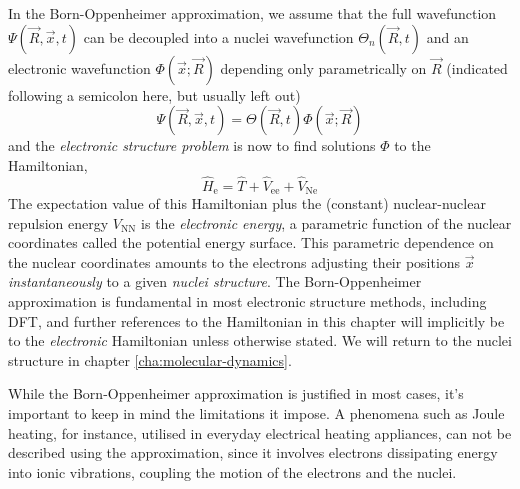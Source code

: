 \documentclass[11pt,bibliography=totoc,index=totoc]{scrbook}   %
\begin{document}


In the Born-Oppenheimer approximation, we assume that the full wavefunction $\Psi(\vec{R},\vec{x},t)$ can be decoupled into 
a nuclei wavefunction $\Theta_n(\vec{R},t)$ and an electronic wavefunction $\Phi(\vec{x};\vec{R})$ depending only parametrically on $\vec{R}$
(indicated following a semicolon here, but usually left out)
\begin{equation}
  \Psi(\vec{R},\vec{x},t) = \Theta(\vec{R},t)\Phi(\vec{x};\vec{R})
\end{equation}
and the \emph{electronic structure problem} is now to find solutions $\Phi$ to the Hamiltonian,
\begin{equation}
    \hat{H}_{\text{e}} = \hat{T} + \hat{V}_{\text{ee}} + \hat{V}_{\text{Ne}}
  \label{eq:el-hamiltonian}
\end{equation}
The expectation value of this Hamiltonian plus the (constant) nuclear-nuclear repulsion energy $V_{\text{NN}}$ is the \emph{electronic energy},\cite[110]{Cramer:2004}
a parametric function of the nuclear coordinates called the potential energy surface.
This parametric dependence on the nuclear coordinates amounts to the electrons adjusting their positions $\vec{x}$ \emph{instantaneously} to a given \emph{nuclei structure}.
The Born-Oppenheimer approximation is fundamental in most electronic structure methods, including DFT, and further references to the Hamiltonian in this chapter will implicitly be to the \emph{electronic} Hamiltonian unless otherwise stated. 
We will return to the nuclei structure in chapter \ref{cha:molecular-dynamics}.

While the Born-Oppenheimer approximation is justified in most cases,\cite[p. 111]{Cramer:2004} it's important to keep in mind the limitations it impose.
A phenomena such as Joule heating, for instance, utilised in everyday electrical heating appliances, can not be described using the approximation, since it involves electrons dissipating energy into ionic vibrations, coupling the motion of the electrons and the nuclei.\cite{Horsfield:2004b}
\end{document}
